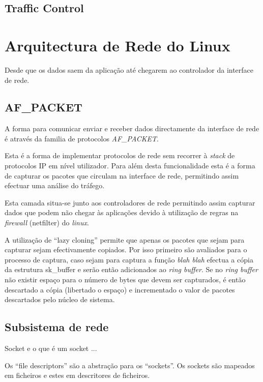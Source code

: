 \subsection{Traffic Control}


\section{Arquitectura de Rede do Linux}

Desde que os dados saem da aplicação até chegarem ao controlador da interface
de rede. 

\subsection{AF\_PACKET}

A forma para comunicar enviar e receber dados directamente da interface de rede
é através da familia de protocolos \textit{AF\_PACKET}. 

Esta é a forma de implementar protocolos de rede sem recorrer à \textit{stack}
de protocolos IP em nível utilizador. Para além desta funcionalidade esta é a
forma de capturar os pacotes que circulam na interface de rede, permitindo
assim efectuar uma análise do tráfego.

Esta camada situa-se junto aos controladores de rede permitindo assim capturar
dados que podem não chegar às aplicações devido à utilização de regras na
\textit{firewall} (netfilter) do \textit{linux}.

A utilização de ``lazy cloning'' permite que apenas os pacotes que sejam para
capturar sejam efectivamente copiados. Por isso primeiro são avaliados para o
processo de captura, caso sejam para captura a função \textit{blah blah}
efectua a cópia da estrutura sk\_buffer e serão então adicionados ao
\textit{ring buffer}. Se no \textit{ring buffer} não existir espaço para o
número de bytes que devem ser capturados, é então descartado a cópia
(libertado o espaço) e incrementado o valor de pacotes descartados pelo núcleo
de sistema.


\subsection{Subsistema de rede} %
\label{subsection:network}
Socket  e o que é um socket ...

Os ``file descriptors'' são a abstração para os ``sockets''. Os sockets são
mapeados em ficheiros e estes em descritores de ficheiros. 

